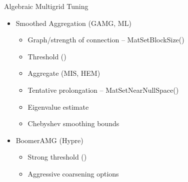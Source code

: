 \begin{frame}{Algebraic Multigrid Tuning}
  \begin{itemize}
  \item Smoothed Aggregation (GAMG, ML)
    \begin{itemize}
    \item Graph/strength of connection -- MatSetBlockSize()
    \item Threshold ()
    \item Aggregate (MIS, HEM)
    \item Tentative prolongation -- MatSetNearNullSpace()
    \item Eigenvalue estimate
    \item Chebyshev smoothing bounds
    \end{itemize}
  \item BoomerAMG (Hypre)
    \begin{itemize}
    \item Strong threshold ()
    \item Aggressive coarsening options
    \end{itemize}
  \end{itemize}
\end{frame}
